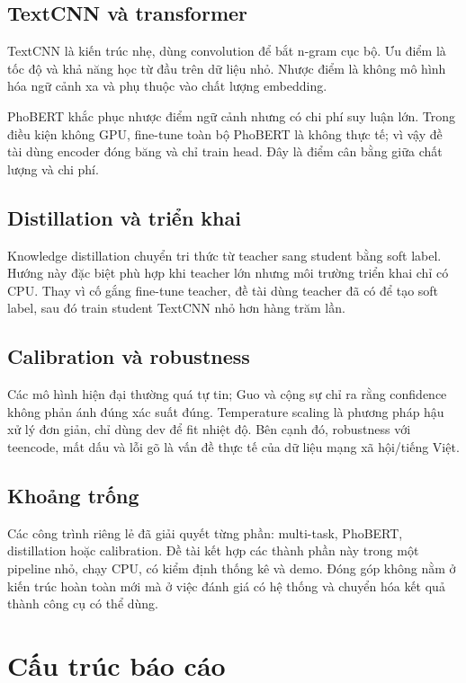 \documentclass[12pt,a4paper]{report}
\begin{document}
\subsection{TextCNN và transformer}

TextCNN \cite{textcnn} là kiến trúc nhẹ, dùng convolution để bắt n-gram cục bộ. Ưu điểm là tốc độ và khả năng học từ đầu trên dữ liệu nhỏ. Nhược điểm là không mô hình hóa ngữ cảnh xa và phụ thuộc vào chất lượng embedding.

PhoBERT \cite{phobert} khắc phục nhược điểm ngữ cảnh nhưng có chi phí suy luận lớn. Trong điều kiện không GPU, fine-tune toàn bộ PhoBERT là không thực tế; vì vậy đề tài dùng encoder đóng băng và chỉ train head. Đây là điểm cân bằng giữa chất lượng và chi phí.

\subsection{Distillation và triển khai}

Knowledge distillation \cite{distill} chuyển tri thức từ teacher sang student bằng soft label. Hướng này đặc biệt phù hợp khi teacher lớn nhưng môi trường triển khai chỉ có CPU. Thay vì cố gắng fine-tune teacher, đề tài dùng teacher đã có để tạo soft label, sau đó train student TextCNN nhỏ hơn hàng trăm lần.

\subsection{Calibration và robustness}

Các mô hình hiện đại thường quá tự tin; Guo và cộng sự \cite{calibration} chỉ ra rằng confidence không phản ánh đúng xác suất đúng. Temperature scaling là phương pháp hậu xử lý đơn giản, chỉ dùng dev để fit nhiệt độ. Bên cạnh đó, robustness với teencode, mất dấu và lỗi gõ là vấn đề thực tế của dữ liệu mạng xã hội/tiếng Việt.

\subsection{Khoảng trống}

Các công trình riêng lẻ đã giải quyết từng phần: multi-task, PhoBERT, distillation hoặc calibration. Đề tài kết hợp các thành phần này trong một pipeline nhỏ, chạy CPU, có kiểm định thống kê và demo. Đóng góp không nằm ở kiến trúc hoàn toàn mới mà ở việc đánh giá có hệ thống và chuyển hóa kết quả thành công cụ có thể dùng.

\section{Cấu trúc báo cáo}
\end{document}
